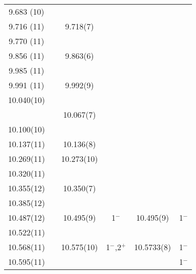 \begin{center}
\begin{longtable}{cc cc cc}
  9.683 (10)      &          &                  &                     &             &                 \\
  9.716 (11)      &          &  9.718(7)        &                     &             &                 \\
  9.770 (11)      &          &                  &                     &             &                 \\
  9.856 (11)      &          &  9.863(6)        &                     &             &                 \\
  9.985 (11)      &          &                  &                     &             &                 \\
  9.991 (11)      &          &  9.992(9)        &                     &             &                 \\
  10.040(10)      &          &                  &                     &             &                 \\
                  &          &  10.067(7)       &                     &             &                 \\
  10.100(10)      &          &                  &                     &             &                 \\
  10.137(11)      &          &  10.136(8)       &                     &             &                 \\
  10.269(11)      &          &  10.273(10)      &                     &             &                 \\
  10.320(11)      &          &                  &                     &             &                 \\
  10.355(12)      &          &  10.350(7)       &                     &             &                 \\
  10.385(12)      &          &                  &                     &             &                 \\
  10.487(12)      &          &  10.495(9)       & 1$^-$               & 10.495(9)   &  1$^-$          \\
  10.522(11)      &          &                  &                     &             &                 \\
10.568(11)        &          &  10.575(10)      & 1$^-$,2$^+$         & 10.5733(8)  &  1$^-$          \\  
  10.595(11)      &          &                  &                     &             &  1$^-$          \\

\end{longtable}
\end{center}

